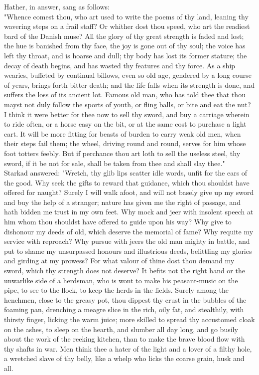 \documentclass[10pt,a4paper]{report}
\begin{document}
Hather, in answer, sang as follows:\\

"Whence comest thou, who art used to write the poems of thy land, leaning thy wavering steps on a frail staff? Or whither dost thou speed, who art the readiest bard of the Danish muse? All the glory of thy great strength is faded and lost; the hue is banished from thy face, the joy is gone out of thy soul; the voice has left thy throat, and is hoarse and dull; thy body has lost its former stature; the decay of death begins, and has wasted thy features and thy force. As a ship wearies, buffeted by continual billows, even so old age, gendered by a long course of years, brings forth bitter death; and the life falls when its strength is done, and suffers the loss of its ancient lot. Famous old man, who has told thee that thou mayst not duly follow the sports of youth, or fling balls, or bite and eat the nut? I think it were better for thee now to sell thy sword, and buy a carriage wherein to ride often, or a horse easy on the bit, or at the same cost to purchase a light cart. It will be more fitting for beasts of burden to carry weak old men, when their steps fail them; the wheel, driving round and round, serves for him whose foot totters feebly. But if perchance thou art loth to sell the useless steel, thy sword, if it be not for sale, shall be taken from thee and shall slay thee."\\

Starkad answered: "Wretch, thy glib lips scatter idle words, unfit for the ears of the good. Why seek the gifts to reward that guidance, which thou shouldst have offered for naught? Surely I will walk afoot, and will not basely give up my sword and buy the help of a stranger; nature has given me the right of passage, and hath bidden me trust in my own feet. Why mock and jeer with insolent speech at him whom thou shouldst have offered to guide upon his way? Why give to dishonour my deeds of old, which deserve the memorial of fame? Why requite my service with reproach? Why pursue with jeers the old man mighty in battle, and put to shame my unsurpassed honours and illustrious deeds, belittling my glories and girding at my prowess? For what valour of thine dost thou demand my sword, which thy strength does not deserve? It befits not the right hand or the unwarlike side of a herdsman, who is wont to make his peasant-music on the pipe, to see to the flock, to keep the herds in the fields. Surely among the henchmen, close to the greasy pot, thou dippest thy crust in the bubbles of the foaming pan, drenching a meagre slice in the rich, oily fat, and stealthily, with thirsty finger, licking the warm juice; more skilled to spread thy accustomed cloak on the ashes, to sleep on the hearth, and slumber all day long, and go busily about the work of the reeking kitchen, than to make the brave blood flow with thy shafts in war. Men think thee a hater of the light and a lover of a filthy hole, a wretched slave of thy belly, like a whelp who licks the coarse grain, husk and all.\\
\end{document}
